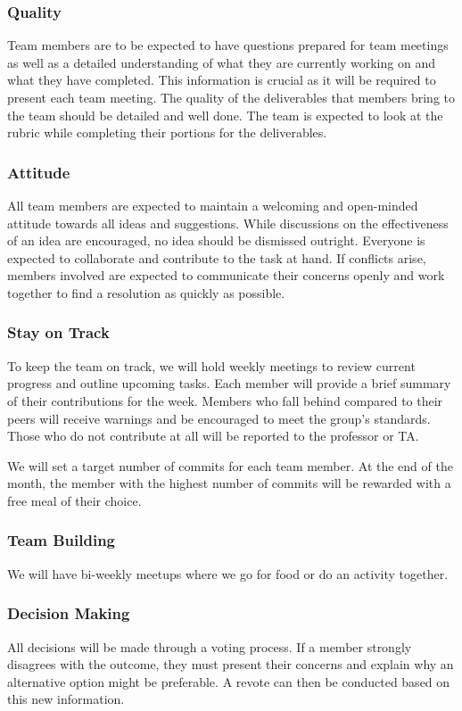 \documentclass{article}
\begin{document}
\subsubsection*{Quality} 
Team members are to be expected to have questions prepared for team meetings as well as a detailed understanding of what they are currently working on and what they have completed. This information is crucial as it will be required to present each team meeting. The quality of the deliverables that members bring to the team should be detailed and well done. The team is expected to look at the rubric while completing their portions for the deliverables.


\subsubsection*{Attitude}
All team members are expected to maintain a welcoming and open-minded attitude towards all ideas and suggestions. While discussions on the effectiveness of an idea are encouraged, no idea should be dismissed outright. Everyone is expected to collaborate and contribute to the task at hand. If conflicts arise, members involved are expected to communicate their concerns openly and work together to find a resolution as quickly as possible.

\subsubsection*{Stay on Track}
To keep the team on track, we will hold weekly meetings to review current progress and outline upcoming tasks. Each member will provide a brief summary of their contributions for the week. Members who fall behind compared to their peers will receive warnings and be encouraged to meet the group’s standards. Those who do not contribute at all will be reported to the professor or TA.

We will set a target number of commits for each team member. At the end of the month, the member with the highest number of commits will be rewarded with a free meal of their choice.
\subsubsection*{Team Building}
We will have bi-weekly meetups where we go for food or do an activity together.

\subsubsection*{Decision Making} 
All decisions will be made through a voting process. If a member strongly disagrees with the outcome, they must present their concerns and explain why an alternative option might be preferable. A revote can then be conducted based on this new information.
\end{document}
